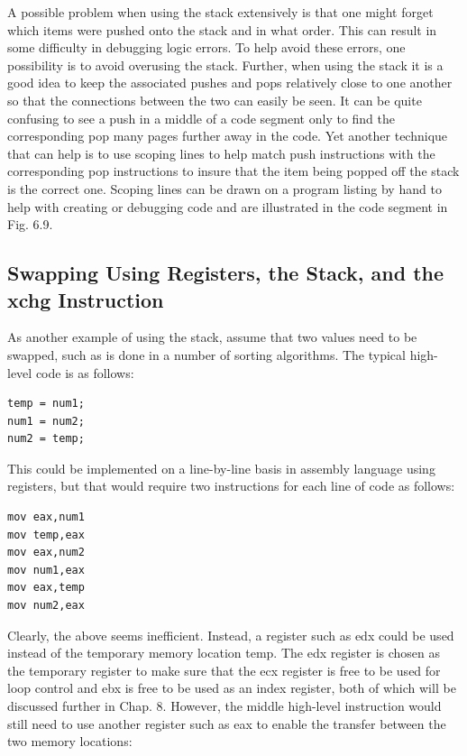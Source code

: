 \documentclass[10pt]{book}
\begin{document}
A possible problem when using the stack extensively is that one might forget which items were pushed onto the stack and in what order. This can result in some difficulty in debugging logic errors. To help avoid these errors, one possibility is to avoid overusing the stack. Further, when using the stack it is a good idea to keep the associated pushes and pops relatively close to one another so that the connections between the two can easily be seen. It can be quite confusing to see a push in a middle of a code segment only to find the corresponding pop many pages further away in the code. Yet another technique that can help is to use scoping lines to help match push instructions with the corresponding pop instructions to insure that the item being popped off the stack is the correct one. Scoping lines can be drawn on a program listing by hand to help with creating or debugging code and are illustrated in the code segment in Fig. 6.9.

\subsection{Swapping Using Registers, the Stack, and the xchg Instruction}
As another example of using the stack, assume that two values need to be swapped, such as is done in a number of sorting algorithms. The typical high-level code is as follows:

\begin{verbatim}
temp = num1;
num1 = num2;
num2 = temp;
\end{verbatim}

This could be implemented on a line-by-line basis in assembly language using registers, but that would require two instructions for each line of code as follows:

\begin{verbatim}
mov eax,num1
mov temp,eax
mov eax,num2
mov num1,eax
mov eax,temp
mov num2,eax
\end{verbatim}

Clearly, the above seems inefficient. Instead, a register such as edx could be used instead of the temporary memory location temp. The edx register is chosen as the temporary register to make sure that the ecx register is free to be used for loop control and ebx is free to be used as an index register, both of which will be discussed further in Chap. 8. However, the middle high-level instruction would still need to use another register such as eax to enable the transfer between the two memory locations:
\end{document}
